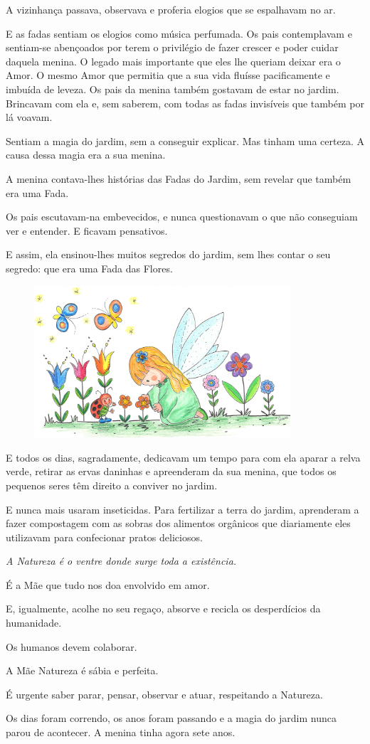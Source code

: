 \documentclass[12pt, a4paper, twoside]{memoir}
\begin{document}
A vizinhança passava, observava e proferia elogios que se espalhavam no ar.

E as fadas sentiam os elogios como música perfumada.
\bigbreak
Os pais contemplavam e sentiam-se abençoados por terem o privilégio de fazer crescer e poder cuidar daquela menina.
O legado mais importante que eles lhe queriam deixar era o Amor.
O mesmo Amor que permitia que a sua vida fluísse pacificamente e imbuída de leveza.
\bigbreak
Os pais da menina também gostavam de estar no jardim. Brincavam com ela e, sem saberem, com todas as fadas invisíveis que também por lá voavam.

Sentiam a magia do jardim, sem a conseguir explicar.
Mas tinham uma certeza. A causa dessa magia era a sua menina.

A menina contava-lhes histórias das Fadas do Jardim, sem revelar que também era uma Fada.

Os pais escutavam-na embevecidos, e nunca questionavam o que não conseguiam ver e entender. E ficavam pensativos.

E assim, ela ensinou-lhes muitos segredos do jardim, sem lhes contar o seu segredo: que era uma Fada das Flores.

\begin{figure}[h]
    \centering
    \includegraphics[width=0.85\textwidth]{cuidando_das_flores}
\end{figure}

E todos os dias, sagradamente, dedicavam um tempo para com ela aparar a relva verde, retirar as ervas daninhas e apreenderam da sua menina, que todos os pequenos seres têm direito a conviver no jardim.

E nunca mais usaram inseticidas. Para fertilizar a terra do jardim, aprenderam a fazer compostagem com as sobras dos alimentos orgânicos que diariamente eles utilizavam para confecionar pratos deliciosos.
\bigbreak
{\itshape
A Natureza é o ventre donde surge toda a existência.

É a Mãe que tudo nos doa envolvido em amor.

E, igualmente, acolhe no seu regaço, absorve e recicla os desperdícios da humanidade.

Os humanos devem colaborar.

A Mãe Natureza é sábia e perfeita.

É urgente saber parar, pensar, observar e atuar, respeitando a Natureza.
}
\bigbreak
Os dias foram correndo, os anos foram passando e a magia do jardim nunca parou de acontecer.
\newpage
A menina tinha agora sete anos.
\end{document}
